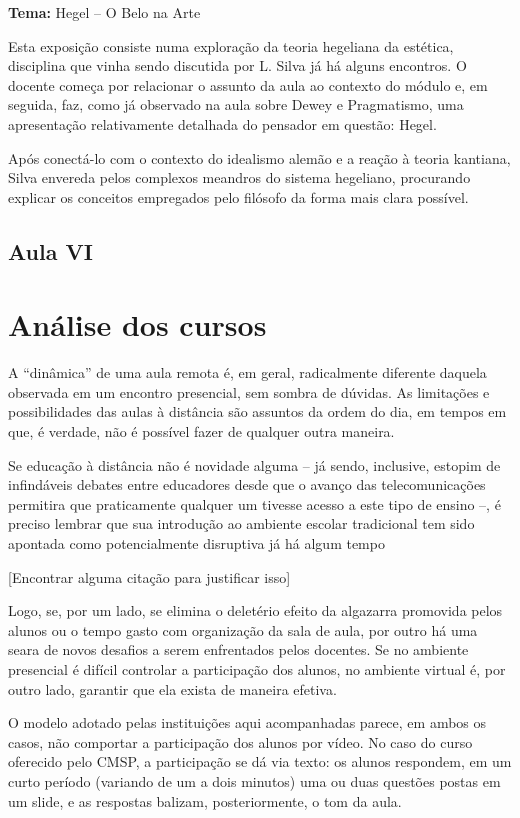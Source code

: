 \documentclass[12pt,a4paper]{article}
\begin{document}
	\textbf{Tema:} Hegel -- O Belo na Arte

	Esta exposição consiste numa exploração da teoria hegeliana da 
	estética, disciplina que vinha sendo discutida por L. Silva já 
	há alguns encontros. O docente começa por relacionar o assunto 
	da aula ao contexto do módulo e, em seguida, faz, como já 
	observado na aula sobre Dewey e Pragmatismo, uma apresentação 
	relativamente detalhada do pensador em questão: Hegel. 

	Após conectá-lo com o contexto do idealismo alemão e a reação 
	à teoria kantiana, Silva envereda pelos complexos meandros do 
	sistema hegeliano, procurando explicar os conceitos empregados 
	pelo filósofo da forma mais clara possível. 

	\subsection{Aula VI}
	
	\newpage
		
	\section{Análise dos cursos}
	
	A “dinâmica” de uma aula remota é, em geral, radicalmente diferente 
	daquela observada em um encontro presencial, sem sombra de dúvidas. 
	As limitações e possibilidades das aulas à distância são assuntos da 
	ordem do dia, em tempos em que, é verdade, não é possível fazer de 
	qualquer outra maneira.

	Se educação à distância não é novidade alguma -- já sendo, inclusive, 
	estopim de infindáveis debates entre educadores desde que o avanço das 
	telecomunicações permitira que praticamente qualquer um tivesse acesso 
	a este tipo de ensino --, é preciso lembrar que sua introdução ao 
	ambiente escolar tradicional tem sido apontada como potencialmente 
	disruptiva já há algum tempo

	[Encontrar alguma citação para justificar isso]

	Logo, se, por um lado, se elimina o deletério efeito da algazarra 
	promovida pelos alunos ou o tempo gasto com organização da sala de 
	aula, por outro há uma seara de novos desafios a serem enfrentados 
	pelos docentes. Se no ambiente presencial é difícil controlar a 
	participação dos alunos, no ambiente virtual é, por outro lado, 
	garantir que ela exista de maneira efetiva. 

	O modelo adotado pelas instituições aqui acompanhadas  
	parece, em ambos os casos, não comportar a participação dos alunos por 
	vídeo. No caso do curso oferecido pelo CMSP, a participação se dá via 
	texto: os alunos respondem, em um curto período (variando de um a dois 
	minutos) uma ou duas questões postas em um slide, e as respostas 
	balizam, posteriormente, o tom da aula. 
	
\end{document}
